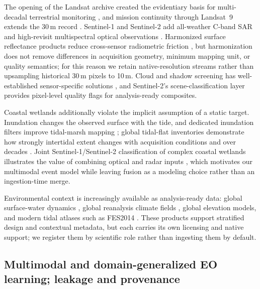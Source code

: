 The opening of the Landsat archive created the evidentiary basis for
multi-decadal terrestrial monitoring \citep{wulder2012archive}, and
mission continuity through Landsat~9 extends the 30\,m record
\citep{masek2020l9}. Sentinel-1 and Sentinel-2 add all-weather C-band
SAR and high-revisit multispectral optical observations
\citep{torres2012s1,drusch2012s2,gascon2017s2}. Harmonized surface
reflectance products reduce cross-sensor radiometric friction
\citep{claverie2018hls}, but harmonization does not remove differences
in acquisition geometry, minimum mapping unit, or quality semantics;
for this reason we retain native-resolution streams rather than
upsampling historical 30\,m pixels to 10\,m. Cloud and shadow
screening has well-established sensor-specific solutions
\citep{zhu2015fmask}, and Sentinel-2's scene-classification layer
provides pixel-level quality flags for analysis-ready composites.

Coastal wetlands additionally violate the implicit assumption of a
static target. Inundation changes the observed surface with the tide,
and dedicated inundation filters improve tidal-marsh mapping
\citep{oconnell2017tmii}; global tidal-flat inventories demonstrate how
strongly intertidal extent changes with acquisition conditions and
over decades \citep{murray2019tidalflats}. Joint Sentinel-1/Sentinel-2
classification of complex coastal wetlands illustrates the value of
combining optical and radar inputs \citep{jamali2022swin}, which
motivates our multimodal event model while leaving fusion as a
modeling choice rather than an ingestion-time merge.

Environmental context is increasingly available as analysis-ready
data: global surface-water dynamics \citep{pekel2016gsw}, global
reanalysis climate fields \citep{munoz2021era5land}, global elevation
models, and modern tidal atlases such as FES2014
\citep{lyard2021fes}. These products support stratified design and
contextual metadata, but each carries its own licensing and native
support; we register them by scientific role rather than ingesting them
by default.

\subsection{Multimodal and domain-generalized EO learning; leakage and provenance}

